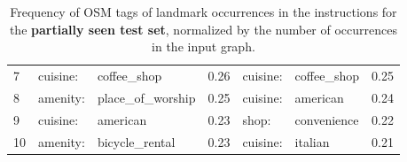 \documentclass[11pt,a4paper]{article}
\begin{document}
\begin{table}
{\begin{tabular}{l|lll|lll|}
\multicolumn{1}{|l|}{7}            & cuisine:     & coffee\_shop          & 0.26                                & cuisine:        & coffee\_shop       & 0.25                                \\
\multicolumn{1}{|l|}{8}            & amenity:     & place\_of\_worship    & 0.25                                & cuisine:        & american           & 0.24                                \\
\multicolumn{1}{|l|}{9}            & cuisine:     & american              & 0.23                                & shop:           & convenience        & 0.22                                \\
\multicolumn{1}{|l|}{10}           & amenity:     & bicycle\_rental       & 0.23                                & cuisine:        & italian            & 0.21                                \\ \hline
\end{tabular}}
\caption{Frequency of OSM tags of landmark occurrences in the instructions for the \textbf{partially seen test set}, normalized by the number of occurrences in the input graph.}
\label{tab:top_landmarks_seen}
\end{table} \begin{table}
\end{table}
\end{document}
